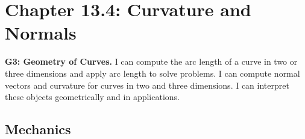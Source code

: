 
\fancyhead[R]{\daysix}

\section*{\centering Chapter 13.4: Curvature and Normals}

\textbf{G3: Geometry of Curves.} I can compute the arc length of a curve in two or three dimensions and apply arc length to solve problems. I can compute normal vectors and curvature for curves in two and three dimensions.  I can interpret these objects geometrically and in applications.

\vspace{-.5cm}

\subsection*{Mechanics}
